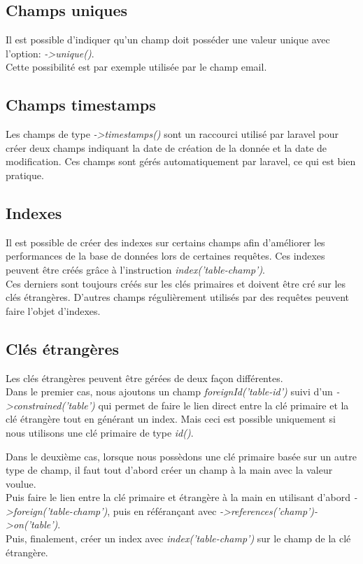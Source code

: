 \documentclass[
    iai, %
    il, %
]{heig-tb}
\begin{document}
\subsection{Champs uniques}
Il est possible d'indiquer qu'un champ doit posséder une valeur unique avec l'option: \emph{->unique()}.\\
Cette possibilité est par exemple utilisée par le champ email.

\subsection{Champs timestamps}
Les champs de type \emph{->timestamps()} sont un raccourci utilisé par \Gls{laravel} pour créer deux champs indiquant la date de création de la donnée et la date de modification. Ces champs sont gérés automatiquement par \Gls{laravel}, ce qui est bien pratique.

\subsection{Indexes}
Il est possible de créer des indexes sur certains champs afin d'améliorer les performances de la base de données lors de certaines requêtes. Ces indexes peuvent être créés grâce à l'instruction \emph{index('table-champ')}.\\
Ces derniers sont toujours créés sur les clés primaires et doivent être cré sur les clés étrangères. D'autres champs régulièrement utilisés par des requêtes peuvent faire l'objet d'indexes.

\subsection{Clés étrangères}
Les clés étrangères peuvent être gérées de deux façon différentes.\\
Dans le premier cas, nous ajoutons un champ \emph{foreignId('table-id')} suivi d'un \emph{->constrained('table')} qui permet de faire le lien direct entre la clé primaire et la clé étrangère tout en générant un index. Mais ceci est possible uniquement si nous utilisons une clé primaire de type \emph{id()}.

Dans le deuxième cas, lorsque nous possèdons une clé primaire basée sur un autre type de champ, il faut tout d'abord créer un champ à la main avec la valeur voulue.\\
Puis faire le lien entre la clé primaire et étrangère à la main en utilisant d'abord \emph{->foreign('table-champ')}, puis en référançant avec \emph{->references('champ')->on('table')}.\\
Puis, finalement, créer un index avec \emph{index('table-champ')} sur le champ de la clé étrangère.
\end{document}
